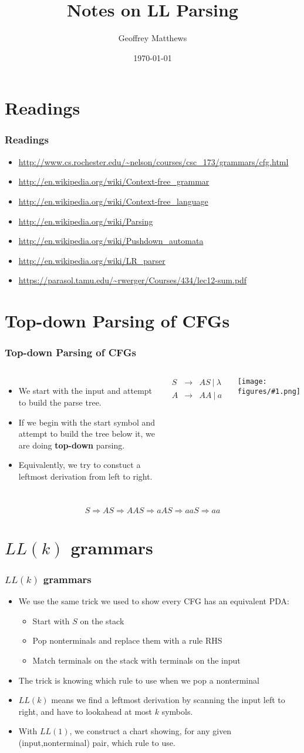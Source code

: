 \documentclass{beamer}
\title[Notes on LL Parsing]
{
Notes on LL Parsing
}
\subtitle{} %
\author[Geoffrey Matthews]
{Geoffrey Matthews}
\institute[WWU/CS]
{
  Department of Computer Science\\
  Western Washington University
}
\date{\today}
\newcommand{\myfig}[1]{\centerline{\texttt{[image: figures/\#1.png]}}}
\newcommand{\arr}{&\rightarrow&}
\newcommand{\bee}{\begin{eqnarray*}}
\newcommand{\eee}{\end{eqnarray*}}
\newcommand{\bi}{\begin{itemize}}
\newcommand{\li}{\item}
\newcommand{\ei}{\end{itemize}}
\newcommand{\sect}[1]{
\section{#1}
\begin{frame}[fragile]\frametitle{#1}
}
\begin{document}
\begin{frame}
  \titlepage
\end{frame}


\newcommand{\myref}[1]{\small\item\url{#1}}
\newcommand{\myreft}[1]{\footnotesize\item\url{#1}}


\sect{Readings}

\begin{itemize}

\myreft{http://www.cs.rochester.edu/~nelson/courses/csc_173/grammars/cfg.html}

\myreft{http://en.wikipedia.org/wiki/Context-free_grammar}

\myreft{http://en.wikipedia.org/wiki/Context-free_language}
\myreft{http://en.wikipedia.org/wiki/Parsing}

\myreft{http://en.wikipedia.org/wiki/Pushdown_automata}
\myreft{http://en.wikipedia.org/wiki/LR_parser}
\myreft{https://parasol.tamu.edu/~rwerger/Courses/434/lec12-sum.pdf}
\end{itemize}

\end{frame}

\sect{Top-down Parsing of CFGs}
\begin{columns}
\bi
\li We start with the input and attempt to build the parse tree.
\li If we begin with the start symbol and attempt to build the tree
below it, we are doing {\bf top-down} parsing.
\li Equivalently, we try to constuct a leftmost derivation from left
to right.
\ei
{}
\bee
S \arr AS\ | \ \lambda\\
A \arr AA\ | \ a
\eee
\myfig{derivationtree}
\end{columns}
\vfill
\[
S \Rightarrow AS \Rightarrow AAS \Rightarrow aAS \Rightarrow aaS \Rightarrow aa
\]
\end{frame}

\sect{$LL(k)$ grammars}
\bi
\li We use the same trick we used to show every CFG has an equivalent PDA:
\bi
\li Start with $S$ on the stack
\li Pop nonterminals and replace them with a rule RHS
\li Match terminals on the stack with terminals on the input
\ei
\li The trick is knowing which rule to use when we pop a nonterminal
\li $LL(k)$ means we find a leftmost derivation by scanning the input
left to right, and have to lookahead at most $k$ symbols.
\li With $LL(1)$, we construct a chart showing, for any given
(input,nonterminal) pair, which rule to use. 
\ei
\end{frame}
\end{document}
